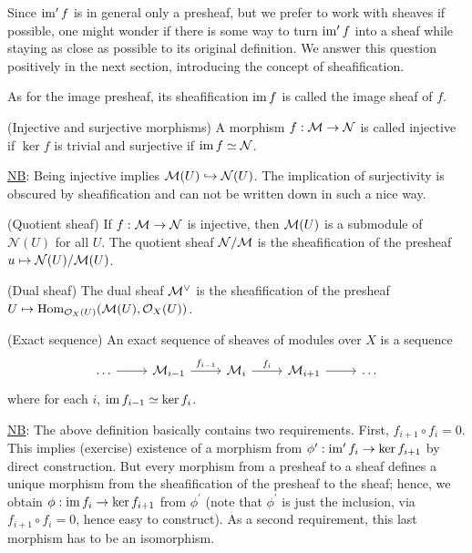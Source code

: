 \documentclass[a4paper,11pt]{article}
\begin{document}
			Since $\operatorname{im}^\prime f$ is in general only a presheaf, but we prefer to work with sheaves if possible, one might wonder if there is some way to turn $\operatorname{im}^\prime f$ into a sheaf while staying as close as possible to its original definition. We answer this question positively in the next section, introducing the concept of sheafification.

			As for the image presheaf, its sheafification $\operatorname{im} f$ is called the image sheaf of $f$.

			\begin{defi}
				(Injective and surjective morphisms) A morphism $f:\mathcal{M}\rightarrow\mathcal{N}$ is called injective if $\ker f$ is trivial and surjective if $\operatorname{im} f\simeq\mathcal{N}$.
			\end{defi}

			\noindent\underline{NB}: Being injective implies $\mathcal{M}(U)\hookrightarrow\mathcal{N}(U)$. The implication of surjectivity is obscured by sheafification and can not be written down in such a nice way.

			\begin{defi}
				(Quotient sheaf) If $f:\mathcal{M}\rightarrow\mathcal{N}$ is injective, then $\mathcal{M}(U)$ is a submodule of $\mathcal{N}(U)$ for all $U$. The quotient sheaf $\mathcal{N}/\mathcal{M}$ is the sheafification of the presheaf $u\mapsto\mathcal{N}(U)/\mathcal{M}(U)$.
			\end{defi}

			\begin{defi}
				(Dual sheaf) The dual sheaf $\mathcal{M}^\vee$ is the sheafification of the presheaf $U\mapsto\operatorname{Hom}_{\mathcal{O}_X(U)}(\mathcal{M}(U),\mathcal{O}_X(U))$.
			\end{defi}

			\begin{defi}
				(Exact sequence) An exact sequence of sheaves of modules over $X$ is a sequence
				\begin{equation*}
					\begin{tikzcd}
						\dots\ar[r] & \M_{i-1}\ar[r,"f_{i-1}"] & \M_i\ar[r,"f_i"] & \M_{i+1}\ar[r] & \dots
					\end{tikzcd}
				\end{equation*}
				where for each $i$, $\operatorname{im} f_{i-1}\simeq\ker f_{i}$.
			\end{defi}

			\noindent\underline{NB}: The above definition basically contains two requirements. First, $f_{i+1}\circ f_i=0$. This implies (exercise) existence of a morphism from $\phi^\prime:\operatorname{im}^\prime f_i\rightarrow\ker f_{i+1}$ by direct construction. But every morphism from a presheaf to a sheaf defines a unique morphism from the sheafification of the presheaf to the sheaf; hence, we obtain $\phi:\operatorname{im} f_i\rightarrow\ker f_{i+1}$ from $\phi^\prime$ (note that $\phi^\prime$ is just the inclusion, via $f_{i+1}\circ f_i=0$, hence easy to construct). As a second requirement, this last morphism has to be an isomorphism.
			
\end{document}
